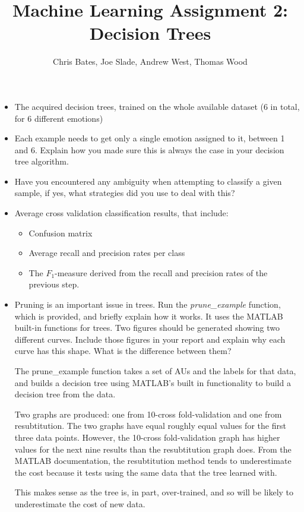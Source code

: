 \documentclass[a4paper]{article}
\title{Machine Learning Assignment 2: Decision Trees}
\author{Chris Bates, Joe Slade, Andrew West, Thomas Wood}
\begin{document}
\maketitle

\begin{itemize}
  \item The acquired decision trees, trained on the whole available dataset (6
    in total, for 6 different emotions)


  \item Each example needs to get only a single emotion assigned to it, between
    1 and 6. Explain how you made sure this is always the case in your decision
    tree algorithm.

  \item Have you encountered any ambiguity when attempting to classify a given
    sample, if yes, what strategies did you use to deal with this?

  \item Average cross validation classification results, that include:
    \begin{itemize}
      \item Confusion matrix
      \item Average recall and precision rates per class
      \item The $F_1$-measure derived from the recall and precision rates of the
        previous step.
    \end{itemize}
    
  \item Pruning is an important issue in trees. Run the \emph{prune\_example}
    function, which is provided, and briefly explain how it works. It uses the
    MATLAB built-in functions for trees. Two figures should be generated showing
    two different curves. Include those figures in your report and explain why
    each curve has this shape. What is the difference between them?

    The prune\_example function takes a set of AUs and the labels for that data,
    and builds a decision tree using MATLAB's built in functionality to build a
    decision tree from the data. 

    Two graphs are produced: one from 10-cross fold-validation and one from 
    resubtitution. The two graphs have equal roughly equal values for the first 
    three data points. However, the 10-cross fold-validation graph has higher
    values for the next nine results than the resubtitution graph does. 
    From the MATLAB documentation, the resubtitution method tends to underestimate
    the cost because it tests using the same data that the tree learned with. 

    This makes sense as the tree is, in part, over-trained, and so will be likely to
    underestimate the cost of new data.


\end{itemize}
\end{document}
